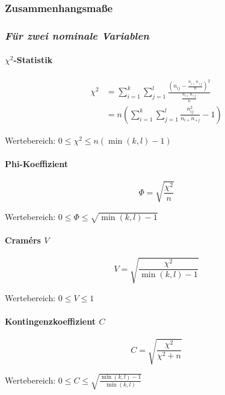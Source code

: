 \documentclass[10pt]{article}
\begin{document}
\subsubsection{Zusammenhangsmaße}

\begin{multicols}{2}

\subsubsection*{\textit{Für zwei nominale Variablen}}

\paragraph{$\chi^2$-Statistik}

\begin{equation*}
\begin{split}
\chi^2 & =\sum\limits_{i=1}^k \sum\limits_{j=1}^l \frac{(n_{ij}-\frac{n_{i+}n_{+j}}{n})^2}{\frac{n_{i+}n_{+j}}{n}} \\ & =n\left(\sum\limits_{i=1}^k \sum\limits_{j=1}^l \frac{n_{ij}^2}{n_{i+}n_{+j}}-1\right)
\end{split}
\end{equation*}

Wertebereich: $ 0 \le \chi^2 \le n(\min(k,l)-1)$

\paragraph{Phi-Koeffizient}

$$\Phi=\sqrt{\frac{\chi^2}{n}}$$

Wertebereich: $ 0 \le \Phi \le \sqrt{\min(k,l)-1}$

\paragraph{Cram\'ers $V$}

$$ V= \sqrt{\frac{\chi^2}{\min(k,l)-1}}$$

Wertebereich: $ 0 \le V \le 1$

\paragraph{Kontingenzkoeffizient $C$}

$$C=\sqrt{\frac{\chi^2}{\chi^2 + n}}$$

Wertebereich: $ 0 \le C \le \sqrt{\frac{\min(k,l)-1}{\min(k,l)}} $


\end{multicols}
\end{document}

